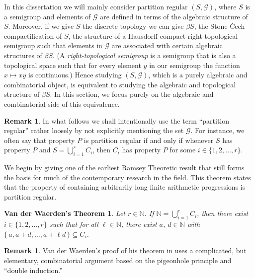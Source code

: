 \documentclass[12pt]{article}
\theoremstyle{plain}
\newtheorem*{vdw}{Van der Waerden's Theorem}
\theoremstyle{definition}
\newtheorem{rmk}[thm]{Remark}
\newcommand{\bbN}{\mathbb{N}}
\newcommand{\calG}{\mathcal{G}}
\begin{document}
In this dissertation we will mainly consider partition regular $(S,
\calG)$, where $S$ is a semigroup and elements of $\calG$ are defined
in terms of the algebraic structure of $S$.
Moreover, if we give $S$ the discrete topology we can give $\beta S$,
the Stone-\v{C}ech compactification of $S$, the structure of a Hausdorff
compact right-topological semigroup 
such that elements in $\calG$ are associated with certain algebraic
structures of $\beta S$. 
(A \textsl{right-topological semigroup} is a semigroup that is also a
topological space such that for every element $y$ in our semigroup the
function $x \mapsto xy$ is continuous.)
Hence studying $(S, \calG)$, which is a purely algebraic and
combinatorial object, is equivalent to studying the algebraic and
topological structure of $\beta S$. 
In this section, we focus purely on the algebraic and combinatorial
side of this equivalence.

\begin{rmk}
  In what follows we shall intentionally use the term ``partition
  regular'' rather loosely by not explicitly mentioning the set
  $\calG$. 
  For instance, we often say that property $P$ is partition regular if
  and only if whenever $S$ has property $P$ and $S = \bigcup_{i=1}^r
  C_i$, then $C_i$ has property $P$ for some $i \in \{1, 2, \ldots,
  r\}$. 
\end{rmk}

We begin by giving one of the earliest Ramsey Theoretic result that
still forms the basis for much of the contemporary research in the
field.
This theorem states that the property of containing arbitrarily long
finite arithmetic progressions is partition regular. 

\begin{vdw}
  Let $r \in \bbN$.
  If $\bbN = \bigcup_{i=1}^r C_i$, then there exist $i \in \{1, 2,
  \ldots, r\}$ such that for all $\ell \in \bbN$, there exist $a$, $d
  \in \bbN$ with $\{\, a, a+d, \ldots, a+\ell d \,\} \subseteq C_i$. 
\end{vdw}

\begin{rmk}
  Van der Waerden's proof of his theorem in
  \cite{Van-der-Waerden:1927fk} uses a complicated, but elementary,
  combinatorial argument based on the pigeonhole principle and ``double
  induction.''%
\end{rmk}
\end{document}
